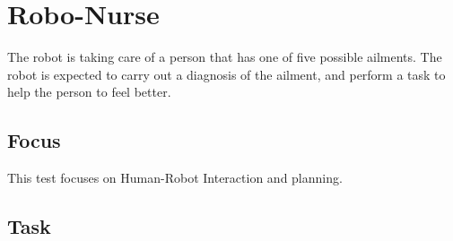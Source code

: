 \section{Robo-Nurse}

The robot is taking care of a person that has one of five possible ailments. The robot is expected to carry out a diagnosis of the ailment, and perform a task to help the person to feel better.

\subsection{Focus}

This test focuses on Human-Robot Interaction and planning.

\subsection{Task}
